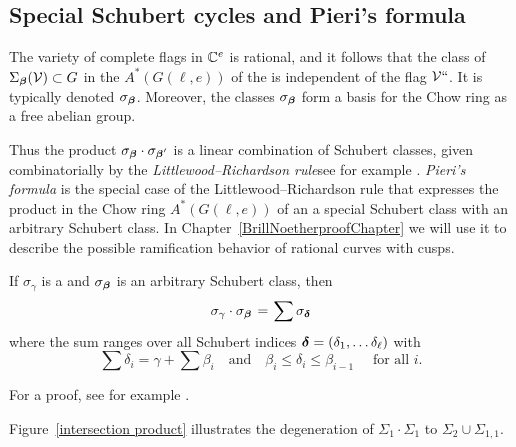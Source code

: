 \subsection*{Special Schubert cycles and Pieri's formula}

\begin{fact}
The variety of complete flags in ${\mathbb C}^e$ is rational, and it follows
%
that the class of $\Sigma_{{\boldsymbol{\beta}}}({\mathcal V})\subset G$
in the 
%
$A^*(G(\ell, e))$ of the 
%
is independent
of the flag ${\mathcal V}` `$. It is typically denoted $\sigma_{{\boldsymbol{\beta}}}$. Moreover,
the classes $\sigma_{{\boldsymbol{\beta}}}$ form a basis for the Chow ring as a free
abelian group.
\end{fact}

Thus the product $\sigma_\bbeta 
\cdot \sigma_{\smash{\bbeta'}\vphantom\beta}$  %
is a linear
combination of Schubert classes,
given combinatorially by the \emph{Littlewood--Richardson rule}\emdash see
%
for example \cite{MR2247964}.
\emph{Pieri's formula} 
%
is the special
case of the Littlewood--Richardson rule that expresses the product in
the Chow ring $A^*(G(\ell, e))$ of an a special Schubert class with an
arbitrary Schubert class.
In Chapter~\ref{BrillNoetherproofChapter} we will use it to describe
the possible ramification behavior of rational curves with cusps.

\begin{proposition}
\label{Pieri}
If $\sigma_\gamma$ is a 
%
and $\sigma_{{\boldsymbol{\beta}}}$
is an arbitrary Schubert class, then
%
$$
\sigma_\gamma \cdot \sigma_{\bbeta} \; = \; \sum \sigma_{\bdelta}
$$
where the sum ranges over all Schubert indices ${{\boldsymbol{\delta}}} = (\delta_1,
\dots \delta_{\ell})$ with
$$
\sum \delta_i = \gamma + \sum \beta_i \quad \text{and} \quad \beta_i
\leq \delta_i \leq \beta_{i-1}\quad \text{ for all } i
.
$$
\end{proposition}

For a proof, see for example \cite[Section 4.2.4]{3264}.

Figure~\ref{intersection product} illustrates the degeneration of
$\Sigma_1\cdot \Sigma_1$ to $\Sigma_2 \cup \Sigma_{1,1}$.

